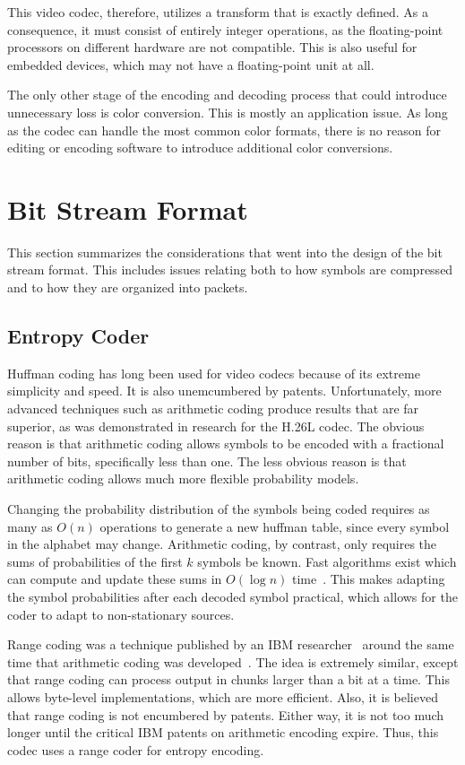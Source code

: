 \documentclass[11pt,letterpaper]{article}
\begin{document}
This video codec, therefore, utilizes a transform that is exactly defined.
As a consequence, it must consist of entirely integer operations, as the
 floating-point processors on different hardware are not compatible.
This is also useful for embedded devices, which may not have a floating-point
 unit at all.

The only other stage of the encoding and decoding process that could introduce
 unnecessary loss is color conversion.
This is mostly an application issue.
As long as the codec can handle the most common color formats, there is no
 reason for editing or encoding software to introduce additional color
 conversions.

\section{Bit Stream Format}

This section summarizes the considerations that went into the design of the
 bit stream format.
This includes issues relating both to how symbols are compressed and to how
 they are organized into packets.

\subsection{Entropy Coder}

Huffman coding has long been used for video codecs because of its extreme
 simplicity and speed.
It is also unemcumbered by patents.
Unfortunately, more advanced techniques such as arithmetic coding produce
 results that are far superior, as was demonstrated in research for the H.26L
 codec.
The obvious reason is that arithmetic coding allows symbols to be encoded with
 a fractional number of bits, specifically less than one.
The less obvious reason is that arithmetic coding allows much more flexible
 probability models.

Changing the probability distribution of the symbols being coded requires as
 many as $O(n)$ operations to generate a new huffman table, since every symbol
 in the alphabet may change.
Arithmetic coding, by contrast, only requires the sums of probabilities of
 the first $k$ symbols be known.
Fast algorithms exist which can compute and update these sums in $O(\log n)$
 time~\cite{Fen94,Fen95,Mof99}.
This makes adapting the symbol probabilities after each decoded symbol
 practical, which allows for the coder to adapt to non-stationary sources.

Range coding was a technique published by an IBM researcher~\cite{Mar79} around
 the same time that arithmetic coding was developed~\cite{Pas76}.
The idea is extremely similar, except that range coding can process output in
 chunks larger than a bit at a time.
This allows byte-level implementations, which are more efficient.
Also, it is believed that range coding is not encumbered by patents.
Either way, it is not too much longer until the critical IBM patents on
 arithmetic encoding expire.
Thus, this codec uses a range coder for entropy encoding.
\end{document}

